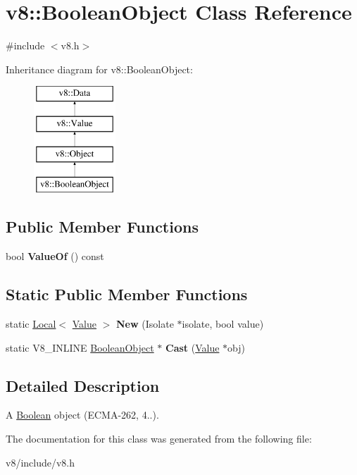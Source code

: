\hypertarget{classv8_1_1BooleanObject}{}\section{v8\+:\+:Boolean\+Object Class Reference}
\label{classv8_1_1BooleanObject}


{\ttfamily \#include $<$v8.\+h$>$}

Inheritance diagram for v8\+:\+:Boolean\+Object\+:\begin{figure}[H]
\begin{center}
\leavevmode
\includegraphics[height=4.000000cm]{classv8_1_1BooleanObject}
\end{center}
\end{figure}
\subsection*{Public Member Functions}
\begin{DoxyCompactItemize}
\item 
\mbox{\label{classv8_1_1BooleanObject_a4f2f60a73ce9a730dd43046672b7b58b}} 
bool {\bfseries Value\+Of} () const
\end{DoxyCompactItemize}
\subsection*{Static Public Member Functions}
\begin{DoxyCompactItemize}
\item 
\mbox{\label{classv8_1_1BooleanObject_aaf29c0574a8366453ddb5a3d4f178ca4}} 
static \mbox{\hyperlink{classv8_1_1Local}{Local}}$<$ \mbox{\hyperlink{classv8_1_1Value}{Value}} $>$ {\bfseries New} (Isolate $\ast$isolate, bool value)
\item 
\mbox{\label{classv8_1_1BooleanObject_a30b2a406f4dd98660c9b8f6030b3f914}} 
static V8\+\_\+\+I\+N\+L\+I\+NE \mbox{\hyperlink{classv8_1_1BooleanObject}{Boolean\+Object}} $\ast$ {\bfseries Cast} (\mbox{\hyperlink{classv8_1_1Value}{Value}} $\ast$obj)
\end{DoxyCompactItemize}


\subsection{Detailed Description}
A \mbox{\hyperlink{classv8_1_1Boolean}{Boolean}} object (E\+C\+M\+A-\/262, 4..). 

The documentation for this class was generated from the following file\+:\begin{DoxyCompactItemize}
\item 
v8/include/v8.\+h\end{DoxyCompactItemize}
